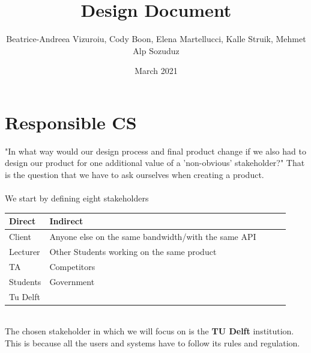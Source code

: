 \documentclass{article}
\title{Design Document}
\author{Beatrice-Andreea Vizuroiu, Cody Boon, Elena Martellucci, Kalle Struik, Mehmet Alp Sozuduz }
\date{March 2021}
\begin{document}
\maketitle

\section{Responsible CS}
"In what way would our design process and final product change if we also had to design our product for one additional value of a 'non-obvious' stakeholder?" That is the question that we have to ask ourselves when creating a product.\\
\\We start by defining eight stakeholders\\
\begin{center}
    \begin{tabular}{ | l | l | l | l | l |}
    \hline
    Direct    & Indirect \\ \hline \hline
    Client  & Anyone else on the same bandwidth/with the same API  \\ \hline
    Lecturer  & Other Students working on the same product  \\ \hline
    TA  & Competitors  \\ \hline
    Students  & Government  \\ \hline
    Tu Delft  &   \\ \hline
    \end{tabular}
\end{center}

\\The chosen stakeholder in which we will focus on is the \textbf{TU Delft} institution.
This is because all the users and systems have to follow its rules and regulation.\\
\end{document}
